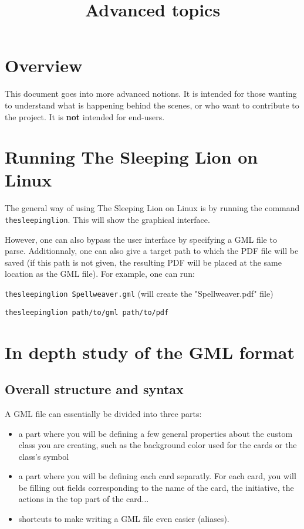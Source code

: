 \documentclass{article}
\title{Advanced topics}
\date{}
\begin{document}
\maketitle
\tableofcontents

\section{Overview}
This document goes into more advanced notions. It is intended for those wanting to understand what is happening behind the scenes, or who want to contribute to the project. It is \textbf{not} intended for end-users.

\section{Running The Sleeping Lion on Linux}
The general way of using The Sleeping Lion on Linux is by running the command \verb#thesleepinglion#. This will show the graphical interface.

However, one can also bypass the user interface by specifying a GML file to parse. Additionnaly, one can also give a target path to which the PDF file will be saved (if this path is not given, the resulting PDF will be placed at the same location as the GML file). For example, one can run:

\verb`thesleepinglion Spellweaver.gml` (will create the "Spellweaver.pdf" file)

\verb`thesleepinglion path/to/gml path/to/pdf`

\section{In depth study of the GML format}
\subsection{Overall structure and syntax}
A GML file can essentially be divided into three parts:
\begin{itemize}
	\item a part where you will be defining a few general properties about the custom class you are creating, such as the background color used for the cards or the class's symbol
	\item a part where you will be defining each card separatly. For each card, you will be filling out fields corresponding to the name of the card, the initiative, the actions in the top part of the card...
	\item shortcuts to make writing a GML file even easier (aliases).
\end{itemize}
\end{document}
